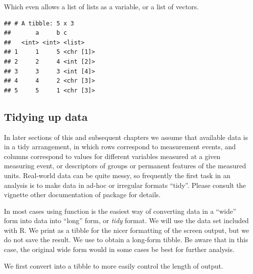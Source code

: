 \documentclass[krantz2]{krantz}\usepackage{knitr}%
\begin{document}
Which even allows a list of lists as a variable, or a list of vectors.

\begin{knitrout}\footnotesize
{}\color{fgcolor}\begin{kframe}
\begin{alltt}
\hlstd{(} \hlstd{=} \hlopt{:}\hlstd{,}  \hlstd{=} \hlopt{:}\hlstd{,}  \hlstd{=} \hlstd{(}\hlstd{,} \hlopt{:}\hlstd{,} \hlopt{:}\hlstd{, letters[}\hlopt{:}\hlstd{], letters[}\hlopt{:}\hlstd{]))}
\end{alltt}
\begin{verbatim}
## # A tibble: 5 x 3
##       a     b c        
##   <int> <int> <list>   
## 1     1     5 <chr [1]>
## 2     2     4 <int [2]>
## 3     3     3 <int [4]>
## 4     4     2 <chr [3]>
## 5     5     1 <chr [3]>
\end{verbatim}
\end{kframe}
\end{knitrout}

\subsection{Tidying up data}

In later sections of this and subsequent chapters we assume that available data is in a tidy arrangement, in which rows correspond to measurement events, and columns correspond to values for different variables measured at a given measuring event, or descriptors of groups or permanent features of the measured units. Real-world data can be quite messy, so frequently the first task in an analysis is to make data in ad-hoc or irregular formats ``tidy''. Please consult the vignette other documentation of package  for details.

In most cases using function  is the easiest way of converting data in a ``wide'' form into data into ``long'' form, or \emph{tidy} format. We will use the  data set included with R. We print  as a tibble for the nicer formatting of the screen output, but we do not save the result. We use  to obtain a long-form tibble. Be aware that in this case, the original wide form would in some cases be best for further analysis.

We first convert  into a tibble to more easily control the length of output.
\end{document}
